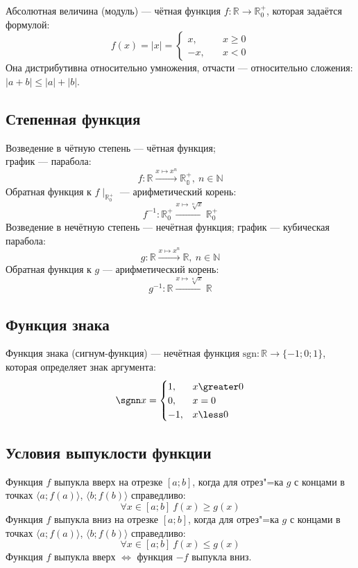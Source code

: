 {\bold Абсолютная величина} {\ital (модуль)} --- чётная функция $f\colon\mathbb{R}
\to\mathbb{R}^+_0$, которая задаётся формулой:
$$f(x)=|x|=\begin{cases}x,\quad &x\geq 0\\-x,\quad &x\less 0\end{cases}$$
Она {\ital дистрибутивна} относительно умножения, отчасти --- относительно
сложения: $|a+b|\leq |a|+|b|$.

\subsection{Степенная функция}

{\bold Возведение в чётную степень} --- чётная функция;\\
график --- {\ital парабола}:\\[-10pt]
$$f\colon\mathbb{R}\xrightarrow{x\mapsto x^n}\mathbb{R^+_0},\ n\in\mathbb{N}$$
Обратная функция к $f\mid_{\mathbb{R}^+_0}$ --- {\bold арифметический корень}:\\[-3pt]
$$f^{-1}\colon\mathbb{R}^+_0\xrightarrow{x\mapsto\sqrt[n]{x}}\mathbb{R}^+_0$$
{\bold Возведение в нечётную степень} --- нечётная функция; график --- {\ital кубическая 
парабола}:
$$g\colon\mathbb{R}\xrightarrow{x\mapsto x^n}\mathbb{R},\ n\in\mathbb{N}$$
Обратная функция к $g$ --- {\bold арифметический корень}:
$$g^{-1}\colon\mathbb{R}\xrightarrow{x\mapsto\sqrt[n]{x}}\mathbb{R}$$

\subsection{Функция знака}

{\bold Функция знака} {\ital (сигнум-функция)} --- нечётная функция $\text{sgn}\colon
\mathbb{R}\to\{-1;0;1\}$, которая определяет знак аргумента:
$$\sgnn x=\begin{cases}
1, &x\greater 0\\
0, &x=0\\
-1, &x\less 0
\end{cases}$$

\subsection{Условия выпуклости функции}

Функция $f$ {\ital выпукла} {\bold вверх} на отрезке $[a;b]$, когда для отрез"=ка $g$
с концами в точках $\langle a;f(a)\rangle$, $\langle b;f(b)\rangle$ справедливо:
$$\forall x\in[a;b]\ f(x)\geq g(x)$$
Функция $f$ {\ital выпукла} {\bold вниз} на отрезке $[a;b]$, когда для отрез"=ка $g$
с концами в точках $\langle a;f(a)\rangle$, $\langle b;f(b)\rangle$ справедливо:
$$\forall x\in[a;b]\ f(x)\leq g(x)$$
Функция $f$ выпукла вверх $\iff$ функция $-f$ выпукла вниз.

